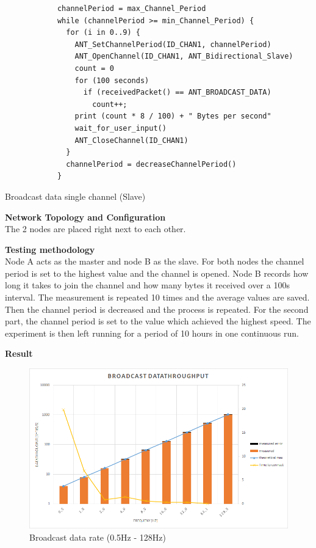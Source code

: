 \begin{description}
		\begin{code}[H]
			\begin{verbatim}
			channelPeriod = max_Channel_Period
			while (channelPeriod >= min_Channel_Period) {
			  for (i in 0..9) {
			    ANT_SetChannelPeriod(ID_CHAN1, channelPeriod)
			    ANT_OpenChannel(ID_CHAN1, ANT_Bidirectional_Slave)
			    count = 0
			    for (100 seconds) 
			      if (receivedPacket() == ANT_BROADCAST_DATA)
			        count++;			  
			    print (count * 8 / 100) + " Bytes per second"
			    wait_for_user_input()
			    ANT_CloseChannel(ID_CHAN1)
			  }
			  channelPeriod = decreaseChannelPeriod()
			}
			\end{verbatim}
			\caption{Broadcast data single channel (Slave)}\label{lst:sExp1}
		\end{code}	
	\item{\textbf{Network Topology and Configuration}} \hfill \\ The 2 nodes are placed right next to each other.
	 \item{\textbf{Testing methodology}} \hfill \\Node A acts as the master and node B as the slave. For both nodes the channel period is set to the highest value and the channel is opened. Node B records how long it takes to join the channel and how many bytes it received over a 100s interval. The measurement is repeated 10 times and the average values are saved. Then the channel period is decreased and the process is repeated. For the second part, the channel period is set to the value which achieved the highest speed. The experiment is then left running for a period of 10 hours in one continuous run.
	\item{\textbf{Result}} \hfill \\  
	\begin{figure}[H]
	\centering
	\includegraphics[scale=0.5]{./pics/exp1_norm.png}
	\caption{Broadcast data rate (0.5Hz - 128Hz)}\label{fig:exp1norm}
	\end{figure}
	

\end{description}
